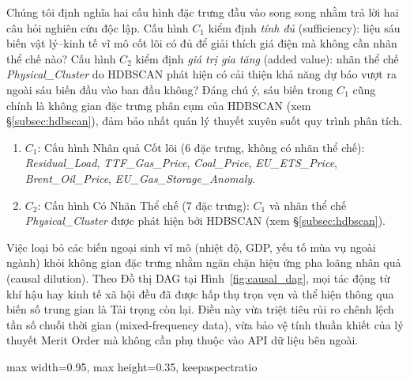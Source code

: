 Chúng tôi định nghĩa hai cấu hình đặc trưng đầu vào song song nhằm trả lời hai câu hỏi nghiên cứu độc lập. Cấu hình $C_1$ kiểm định \textit{tính đủ} (sufficiency): liệu sáu biến vật lý--kinh tế vĩ mô cốt lõi có đủ để giải thích giá điện mà không cần nhãn thể chế nào? Cấu hình $C_2$ kiểm định \textit{giá trị gia tăng} (added value): nhãn thể chế \textit{Physical\_Cluster} do HDBSCAN phát hiện có cải thiện khả năng dự báo vượt ra ngoài sáu biến đầu vào ban đầu không? Đáng chú ý, sáu biến trong $C_1$ cũng chính là không gian đặc trưng phân cụm của HDBSCAN (xem \S\ref{subsec:hdbscan}), đảm bảo nhất quán lý thuyết xuyên suốt quy trình phân tích.
\begin{enumerate}[noitemsep, topsep=3pt, parsep=3pt]
  \raggedright
  \item $C_1$: Cấu hình Nhân quả Cốt lõi (6 đặc trưng, không có nhãn thể chế): \textit{Residual\_Load}, \textit{TTF\_Gas\_Price}, \textit{Coal\_Price}, \textit{EU\_ETS\_Price}, \textit{Brent\_Oil\_Price}, \textit{EU\_Gas\_Storage\_Anomaly}.
  \item $C_2$: Cấu hình Có Nhãn Thể chế (7 đặc trưng): $C_1$ và nhãn thể chế \textit{Physical\_Cluster} được phát hiện bởi HDBSCAN (xem \S\ref{subsec:hdbscan}).
\end{enumerate}

Việc loại bỏ các biến ngoại sinh vĩ mô (nhiệt độ, GDP, yếu tố mùa vụ ngoài ngành) khỏi không gian đặc trưng nhằm ngăn chặn hiệu ứng pha loãng nhân quả (causal dilution). Theo Đồ thị DAG tại Hình~\ref{fig:causal_dag}, mọi tác động từ khí hậu hay kinh tế xã hội đều đã được hấp thụ trọn vẹn và thể hiện thông qua biến số trung gian là Tải trọng còn lại. Điều này vừa triệt tiêu rủi ro chênh lệch tần số chuỗi thời gian (mixed-frequency data), vừa bảo vệ tính thuần khiết của lý thuyết Merit Order mà không cần phụ thuộc vào API dữ liệu bên ngoài.

\begin{strip}
  \centering
  \begin{adjustbox}{max width=0.95\textwidth, max height=0.35\textheight, keepaspectratio}
  \end{adjustbox}
  \label{fig:causal_dag}
\end{strip}

